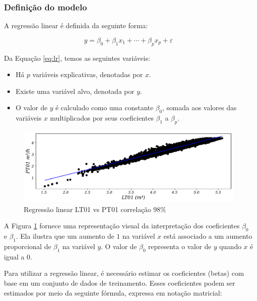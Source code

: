 \subsubsection{Defini\c c\~ ao do modelo}

A regressão linear é definida da seguinte forma:

\begin{equation}
	y = \beta_0 + \beta_1 x_1 + \cdots + \beta_p x_p + \varepsilon \label{eq:lr}
\end{equation}

Da Equação \eqref{eq:lr}, temos as seguintes variáveis:

\begin{itemize}
	\item Há $p$ variáveis explicativas, denotadas por $x$.
	\item Existe uma variável alvo, denotada por $y$.
	\item O valor de $y$ é calculado como uma constante $\beta_0$, somada aos valores das variáveis $x$ multiplicados por seus coeficientes $\beta_1$ a $\beta_p$.
\end{itemize}

\begin{figure}[H]
	\centering
	\caption{Regressão linear LT01 vs PT01 correlação 98\%}
	\label{fig:lr-lt01-m3}
	\includegraphics[width=1\linewidth]{"Modelos/Figuras/LR LT01 (m³)"}
	
\end{figure}



A Figura \ref{fig:lr-lt01-m3} fornece uma representação visual da interpretação dos coeficientes $\beta_0$ e $\beta_1$. Ela ilustra que um aumento de $1$ na variável $x$ está associado a um aumento proporcional de $\beta_1$ na variável $y$. O valor de $\beta_0$ representa o valor de $y$ quando $x$ é igual a $0$.

Para utilizar a regressão linear, é necessário estimar os coeficientes (betas) com base em um conjunto de dados de treinamento. Esses coeficientes podem ser estimados por meio da seguinte fórmula, expressa em notação matricial:

